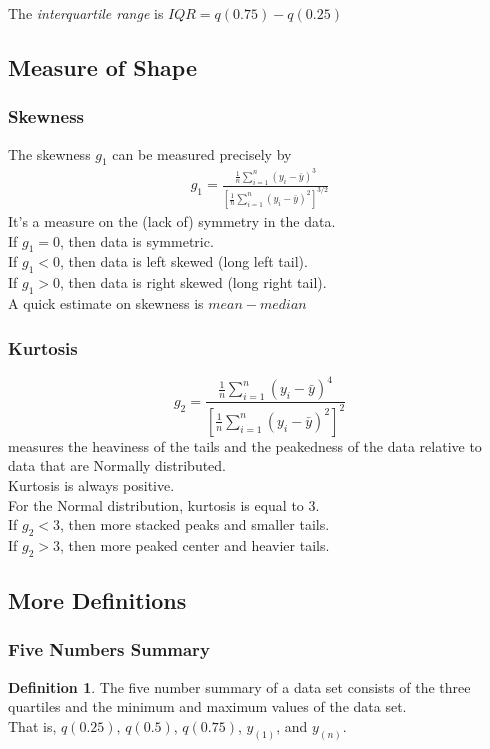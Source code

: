 \documentclass[12pt, leqno]{article}
\theoremstyle{definition}
\newtheorem*{defn}{Definition}
\begin{document}
  The \emph{interquartile range} is $IQR = q(0.75) - q(0.25)$

  \subsection{Measure of Shape}
  \subsubsection{Skewness}
  The skewness $g_{1}$ can be measured precisely by
  \begin{align*}
  g_{1} =
  \frac{\frac{1}{n}\sum_{i=1}^{n}(y_{i} - \bar{y})^{3}}{\left[\frac{1}{n}\sum_{i=1}^{n}(y_{i} - \bar{y})^{2}\right]^{3/2}}
  \end{align*}
  It's a measure on the (lack of) symmetry in the data. \\
  If $g_{1} = 0$, then data is symmetric. \\
  If $g_{1} < 0$, then data is left skewed (long left tail). \\
  If $g_{1} > 0$, then data is right skewed (long right tail). \\
  A quick estimate on skewness is $mean - median$
  \subsubsection{Kurtosis}
  $$g_{2} = \frac{\frac{1}{n}\sum_{i=1}^{n}(y_{i} - \bar{y})^{4}}{\left[\frac{1}{n}\sum_{i=1}^{n}(y_{i} - \bar{y})^{2}\right]^{2}}$$
  measures the heaviness of the tails and the peakedness of the data relative to data that are Normally distributed. \\
  Kurtosis is always positive. \\
  For the Normal distribution, kurtosis is equal to 3. \\
  If $g_{2} < 3$, then more stacked peaks and smaller tails. \\
  If $g_{2} > 3$, then more peaked center and heavier tails.

  \subsection{More Definitions}
  \subsubsection{Five Numbers Summary}
  \begin{defn}
    The five number summary of a data set consists of the three quartiles and the minimum and maximum values of the data set. \\
    That is, $q(0.25)$, $q(0.5)$, $q(0.75)$, $y_{(1)}$, and $y_{(n)}$.
  \end{defn}
\end{document}
